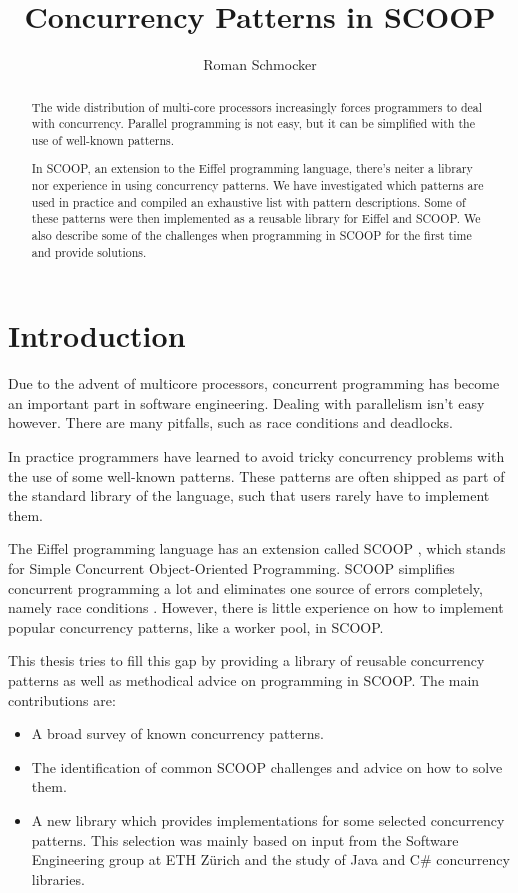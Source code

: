 \documentclass[a4paper,10pt]{article}
\title{Concurrency Patterns in SCOOP}
\author{Roman Schmocker}
\begin{document}
\maketitle

\begin{abstract}
The wide distribution of multi-core processors increasingly forces programmers to deal with concurrency.
Parallel programming is not easy, but it can be simplified with the use of well-known patterns.

In SCOOP, an extension to the Eiffel programming language, there's neiter a library nor experience in using concurrency patterns.
We have investigated which patterns are used in practice and compiled an exhaustive list with pattern descriptions.
Some of these patterns were then implemented as a reusable library for Eiffel and SCOOP.
We also describe some of the challenges when programming in SCOOP for the first time and provide solutions.
\end{abstract}


\tableofcontents

\section{Introduction}
\label{sec:introduction}

Due to the advent of multicore processors, concurrent programming has become an important part in software engineering.
Dealing with parallelism isn't easy however.
There are many pitfalls, such as race conditions and deadlocks.

In practice programmers have learned to avoid tricky concurrency problems with the use of some well-known patterns.
These patterns are often shipped as part of the standard library of the language, such that users rarely have to implement them.

The Eiffel programming language \cite{web:ecma-eiffel}\cite{book:touchofclass} has an extension called SCOOP \cite{Nienaltowski07}\cite{web:scoop},
which stands for Simple Concurrent Object-Oriented Programming.
SCOOP simplifies concurrent programming a lot and eliminates one source of errors completely, namely race conditions \cite{Nienaltowski07}.
However, there is little experience on how to implement popular concurrency patterns, like a worker pool, in SCOOP.

This thesis tries to fill this gap by providing a library of reusable concurrency patterns as well as methodical advice on programming in SCOOP.
The main contributions are:
\begin{itemize}
 \item A broad survey of known concurrency patterns.
 \item The identification of common SCOOP challenges and advice on how to solve them.
 \item A new library which provides implementations for some selected concurrency patterns.
 This selection was mainly based on input from the Software Engineering group at ETH Zürich and the study of Java \cite{web:java-concurrency} and C\# \cite{web:ms-tpl} concurrency libraries.
\end{itemize}
\end{document}
